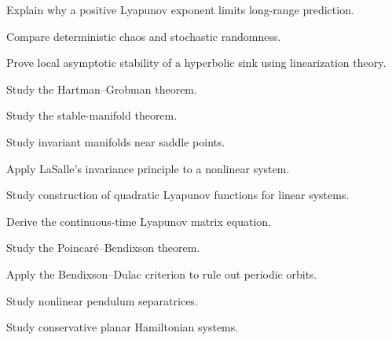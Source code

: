 \begin{exercise}[3]
Explain why a positive Lyapunov exponent limits long-range prediction.
\end{exercise}

\begin{exercise}[3]
Compare deterministic chaos and stochastic randomness.
\end{exercise}

\begin{exercise}[4]
Prove local asymptotic stability of a hyperbolic sink using
linearization theory.
\end{exercise}

\begin{exercise}[4]
Study the Hartman--Grobman theorem.
\end{exercise}

\begin{exercise}[4]
Study the stable-manifold theorem.
\end{exercise}

\begin{exercise}[4]
Study invariant manifolds near saddle points.
\end{exercise}

\begin{exercise}[4]
Apply LaSalle's invariance principle to a nonlinear system.
\end{exercise}

\begin{exercise}[4]
Study construction of quadratic Lyapunov functions for linear systems.
\end{exercise}

\begin{exercise}[4]
Derive the continuous-time Lyapunov matrix equation.
\end{exercise}

\begin{exercise}[4]
Study the Poincaré--Bendixson theorem.
\end{exercise}

\begin{exercise}[4]
Apply the Bendixson--Dulac criterion to rule out periodic orbits.
\end{exercise}

\begin{exercise}[4]
Study nonlinear pendulum separatrices.
\end{exercise}

\begin{exercise}[4]
Study conservative planar Hamiltonian systems.
\end{exercise}

